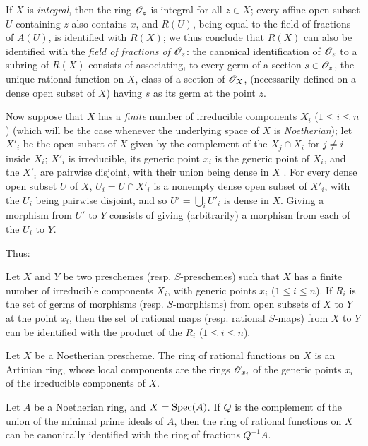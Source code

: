 If $X$ is \emph{integral}, then the ring $\mathscr{O}_z$ is integral for all $z\in X$; every affine open subset $U$ containing $z$ also contains $x$, and $R(U)$, being equal to the field of fractions of $A(U)$, is identified with $R(X)$; we thus conclude that $R(X)$ can also be identified with the \emph{field of fractions of $\mathscr{O}_z$}: the canonical identification of $\mathscr{O}_z$ to a subring of $R(X)$ consists of associating, to every germ of a section $s\in\mathscr{O}_z$, the unique rational function on $X$, class of a section of $\mathscr{O}_X$, (necessarily defined on a dense open subset of $X$) having $s$ as its germ at the point $z$.

\begin{env}[7.1.6]
\label{1.7.1.6}
Now suppose that $X$ has a \emph{finite} number of irreducible components $X_i$ ($1\leq i\leq n$) (which will be the case whenever the underlying space of $X$ is \emph{Noetherian}); let $X'_i$ be the open subset of $X$ given by the complement of the $X_j\cap X_i$ for $j\neq i$ inside $X_i$; $X'_i$ is irreducible, its generic point $x_i$ is the generic point of $X_i$, and the $X'_i$ are pairwise disjoint, with their union being dense in $X$ .
For every dense open subset $U$ of $X$, $U_i=U\cap X'_i$ is a nonempty dense open subset of $X'_i$, with the $U_i$ being pairwise disjoint, and so $U'=\bigcup_i U'_i$ is dense in $X$.
Giving a morphism from $U'$ to $Y$ consists of giving (arbitrarily) a morphism from each of the $U_i$ to $Y$.
\end{env}

Thus:
\begin{proposition}[7.1.7]
\label{1.7.1.7}
Let $X$ and $Y$ be two preschemes (resp. $S$-preschemes) such that $X$ has a finite number of irreducible components $X_i$, with generic points $x_i$ ($1\leq i\leq n$).
If $R_i$ is the set of germs of morphisms (resp. $S$-morphisms) from open subsets of $X$ to $Y$ at the point $x_i$, then the set of rational maps (resp. rational $S$-maps) from $X$ to $Y$ can be identified with the product of the $R_i$ ($1\leq i\leq n$).
\end{proposition}

\begin{corollary}[7.1.8]
\label{1.7.1.8}
Let $X$ be a Noetherian prescheme.
The ring of rational functions on $X$ is an Artinian ring, whose local components are the rings $\mathscr{O}_{x_i}$ of the generic points $x_i$ of the irreducible components of $X$.
\end{corollary}

\begin{corollary}[7.1.9]
\label{1.7.1.9}
Let $A$ be a Noetherian ring, and $X=\operatorname{Spec}(A)$.
If $Q$ is the complement of the union of the minimal prime ideals of $A$, then the ring of rational functions on $X$ can be canonically identified with the ring of fractions $Q^{-1}A$.
\end{corollary}

